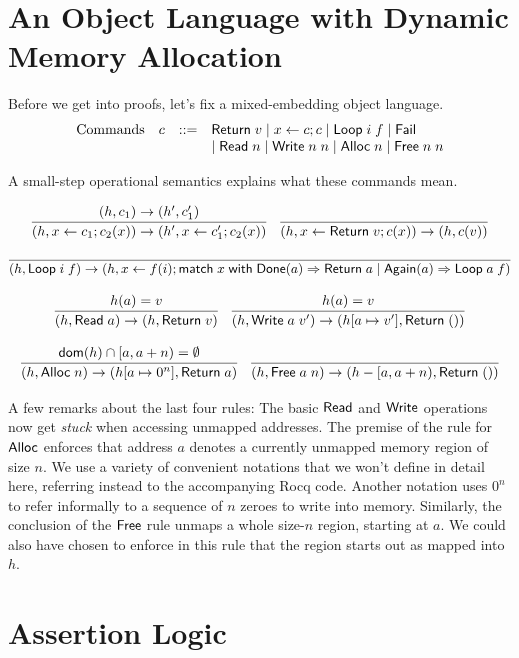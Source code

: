 \documentclass{amsbook}
\theoremstyle{definition}
\theoremstyle{remark}
\numberwithin{section}{chapter}
\numberwithin{equation}{chapter}
\begin{document}
\section{An Object Language with Dynamic Memory Allocation}

Before we get into proofs, let's fix a mixed-embedding object language.
$$\begin{array}{rrcl}
  \textrm{Commands} & c &::=& \mathsf{Return} \; v \mid x \leftarrow c; c \mid \mathsf{Loop} \; i \; f \mid \mathsf{Fail} \\
  &&& \mid \mathsf{Read} \; n \mid \mathsf{Write} \; n \; n \mid \mathsf{Alloc} \; n \mid \mathsf{Free} \; n \; n
\end{array}$$

A small-step operational semantics explains what these commands mean.

$$\infer{\smallstep{(h, x \leftarrow c_1; c_2(x))}{(h', x \leftarrow c'_1; c_2(x))}}{
  \smallstep{(h, c_1)}{(h', c'_1)}
}
\quad \infer{\smallstep{(h, x \leftarrow \mt{Return} \; v; c(x))}{(h, c(v))}}{}$$

$$\infer{\smallstep{(h, \mt{Loop} \; i \; f)}{(h, x \leftarrow f(i); \mt{match} \; x \; \mt{with} \; \mt{Done}(a) \Rightarrow \mt{Return} \; a \mid \mt{Again}(a) \Rightarrow \mt{Loop} \; a \; f)}}{}$$

$$\infer{\smallstep{(h, \mt{Read} \; a)}{(h, \mt{Return} \; v)}}{
  \msel{h}{a} = v
}
\quad \infer{\smallstep{(h, \mt{Write} \; a \; v')}{(\mupd{h}{a}{v'}, \mt{Return} \; ())}}{
  \msel{h}{a} = v
}$$

$$\infer{\smallstep{(h, \mt{Alloc} \; n)}{(\mupd{h}{a}{0^n}, \mt{Return} \; a)}}{
  \dom{h} \cap [a, a+n) = \emptyset
}
\quad \infer{\smallstep{(h, \mt{Free} \; a \; n)}{(h - [a, a+n), \mt{Return} \; ())}}{
}$$

A few remarks about the last four rules:
The basic $\mathsf{Read}$ and $\mathsf{Write}$ operations now get \emph{stuck} when accessing unmapped addresses.
The premise of the rule for $\mathsf{Alloc}$ enforces that address $a$ denotes a currently unmapped memory region of size $n$.
We use a variety of convenient notations that we won't define in detail here, referring instead to the accompanying Rocq code.
Another notation uses $0^n$ to refer informally to a sequence of $n$ zeroes to write into memory.
Similarly, the conclusion of the $\mathsf{Free}$ rule unmaps a whole size-$n$ region, starting at $a$.
We could also have chosen to enforce in this rule that the region starts out as mapped into $h$.

\section{Assertion Logic}
\end{document}
